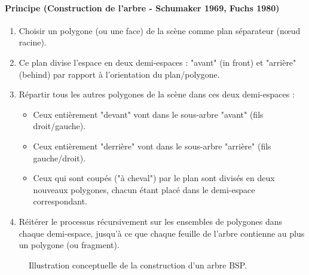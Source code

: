 \documentclass{article}
\begin{document}
{\paragraph{Principe (Construction de l'arbre - Schumaker 1969, Fuchs 1980)}
\begin{enumerate}
    \item Choisir un polygone (ou une face) de la scène comme plan séparateur (nœud racine).
    \item Ce plan divise l'espace en deux demi-espaces : "avant" (in front) et "arrière" (behind) par rapport à l'orientation du plan/polygone.
    \item Répartir tous les autres polygones de la scène dans ces deux demi-espaces :
    \begin{itemize}
        \item Ceux entièrement "devant" vont dans le sous-arbre "avant" (fils droit/gauche).
        \item Ceux entièrement "derrière" vont dans le sous-arbre "arrière" (fils gauche/droit).
        \item Ceux qui sont coupés ("à cheval") par le plan sont divisés en deux nouveaux polygones, chacun étant placé dans le demi-espace correspondant.
    \end{itemize}
    \item Réitérer le processus récursivement sur les ensembles de polygones dans chaque demi-espace, jusqu'à ce que chaque feuille de l'arbre contienne au plus un polygone (ou fragment).
\end{enumerate}

\begin{figure}[H]
    \centering
    \caption{Illustration conceptuelle de la construction d'un arbre BSP.}
    \label{fig:bsp_construction}
\end{figure}

}
\end{document}

